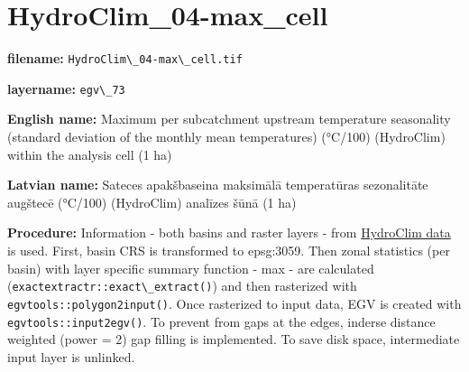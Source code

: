 \documentclass[
]{book}
\newcommand{\passthrough}[1]{#1}
\begin{document}
\section{HydroClim\_04-max\_cell}\label{ch06.073}

\textbf{filename:} \passthrough{\lstinline!HydroClim\_04-max\_cell.tif!}

\textbf{layername:} \passthrough{\lstinline!egv\_73!}

\textbf{English name:} Maximum per subcatchment upstream temperature seasonality (standard deviation of the monthly mean temperatures) (°C/100) (HydroClim) within the analysis cell (1 ha)

\textbf{Latvian name:} Sateces apakšbaseina maksimālā temperatūras sezonalitāte augštecē (°C/100) (HydroClim) analīzes šūnā (1 ha)

\textbf{Procedure:} Information - both basins and raster layers - from \hyperref[Ch04.12]{HydroClim data}
is used. First, basin CRS is transformed to epsg:3059. Then zonal statistics (per basin) with
layer specific summary function - max - are calculated (\passthrough{\lstinline!exactextractr::exact\_extract()!})
and then rasterized with \passthrough{\lstinline!egvtools::polygon2input()!}. Once rasterized to input data,
EGV is created with \passthrough{\lstinline!egvtools::input2egv()!}. To prevent from gaps at the edges,
inderse distance weighted (power = 2) gap filling is implemented. To save disk space,
intermediate input layer is unlinked.
\end{document}
